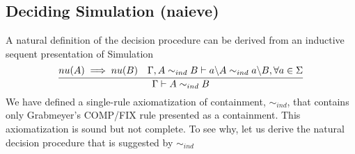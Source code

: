 \documentclass[a4paper,UKenglish,cleveref, autoref, thm-restate]{lipics-v2021}
\begin{document}
\subsection{Deciding Simulation (naieve)}
A natural definition of the decision procedure can be derived from an inductive sequent presentation of Simulation 
\[\infer{\Gamma \vdash A \simind B}{\mynu{A} \implies \mynu{B} &  \Gamma, A \simind B \vdash \derive{a}{A} \simind \derive{a}{B},\forall a \in \Sigma }\]
We have defined a single-rule axiomatization of containment, $\sim_{ind}$, that contains only Grabmeyer's \textsf{COMP/FIX} rule presented as a containment. This axiomatization is sound but not complete. To see why, let us derive the natural decision procedure that is suggested by $\sim_{ind}$
\end{document}
